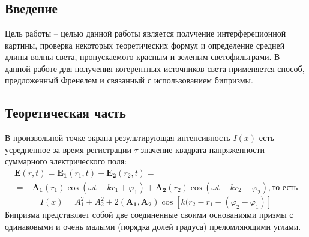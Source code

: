 
\usepackage{setspace}



\def\labauthors{Понур К.А., Сарафанов Ф.Г., Сидоров Д.А.}
\def\labgroup{420}
\def\labnumber{999}
\def\labtheme{Изучение интерференции в схеме с бипризмой Френеля}
\renewcommand{\vec}{\mathbf}
\renewcommand{\Re}{\operatorname{Re}}
\renewcommand{\Im}{\operatorname{Im}}
\renewcommand{\phi}{\phi}
\renewcommand{\kappa}{\varkappa}
\renewcommand{\hat}{\widehat}
\renewcommand{\epsilon}{\varepsilon}
\renewcommand{\phi}{\varphi}

\begin{spacing}{1}
\tableofcontents
\end{spacing}
\newpage


 \section{}
\subsection{Введение}

Цель работы -- целью данной работы является получение интерфереционной картины, проверка некоторых теоретических формул
и определение средней длины волны света, пропускаемого красным и зеленым светофильтрами.
В данной работе для получения когерентных источников света применяется способ, предложенный Френелем и связанный с использованием бипризмы.
\subsection{Теоретическая часть}
В произвольной точке экрана результирующая интенсивность $I(x)$ есть усредненное за время регистрации $\tau$ значение квадрата напряженности суммарного электрического поля:
\begin{gather}
\label{eq:1}
	\vec{E}(r,t)=\vec{E_1}(r_1,t)+\vec{E_2}(r_2,t)=\\=
	-\vec{A_1}(r_1)\cos(\omega t-kr_1+\phi_1)+\vec{A_2}(r_2)
		\cos(\omega t -kr_2+\phi_2), \text{то есть} \nonumber
\end{gather}
\begin{equation}
	I(x)=A_1^2+A_2^2+2(\vec{A_1},\vec{A_2})\cos[k(r_2-r_1-(\phi_2-\phi_1)]
\end{equation}
Бипризма представляет собой две соединенные своими основаниями призмы с одинаковыми и очень малыми (порядка долей градуса) преломляющими углами. 

